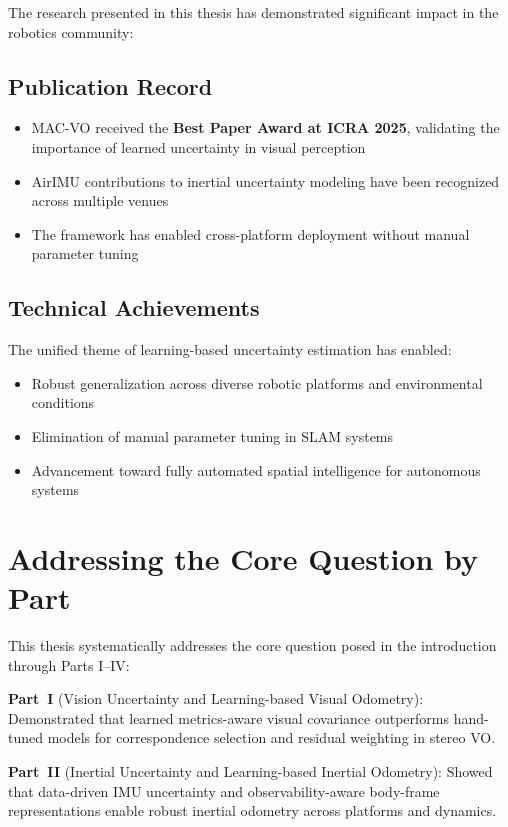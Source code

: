 The research presented in this thesis has demonstrated significant impact in the robotics community:

\subsection{Publication Record}
\begin{itemize}
    \item MAC-VO received the \textbf{Best Paper Award at ICRA 2025}, validating the importance of learned uncertainty in visual perception
    \item AirIMU contributions to inertial uncertainty modeling have been recognized across multiple venues
    \item The framework has enabled cross-platform deployment without manual parameter tuning
\end{itemize}

\subsection{Technical Achievements}
The unified theme of learning-based uncertainty estimation has enabled:
\begin{itemize}
    \item Robust generalization across diverse robotic platforms and environmental conditions
    \item Elimination of manual parameter tuning in SLAM systems
    \item Advancement toward fully automated spatial intelligence for autonomous systems
\end{itemize}

\section{Addressing the Core Question by Part}

This thesis systematically addresses the core question posed in the introduction through Parts I--IV:

\textbf{Part~I} (Vision Uncertainty and Learning-based Visual Odometry): Demonstrated that learned metrics-aware visual covariance outperforms hand-tuned models for correspondence selection and residual weighting in stereo VO.

\textbf{Part~II} (Inertial Uncertainty and Learning-based Inertial Odometry): Showed that data-driven IMU uncertainty and observability-aware body-frame representations enable robust inertial odometry across platforms and dynamics.

